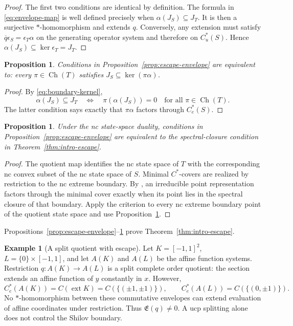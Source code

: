 \documentclass[11pt,a4paper]{amsart}
\theoremstyle{plain}
\newtheorem{proposition}[theorem]{Proposition}
\theoremstyle{definition}
\newtheorem{example}[theorem]{Example}
\newcommand{\Cu}{C_u^*}
\newcommand{\Ce}{C_e^*}
\newcommand{\Esc}{\mathfrak E}
\newcommand{\Ch}{\operatorname{Ch}}
\begin{document}
\begin{proof}
The first two conditions are identical by definition.  The formula in
\eqref{eq:envelope-map} is well defined precisely when $\alpha(J_S)\subseteq J_T$.  It is then a
surjective $*$-homomorphism and extends $q$.  Conversely, any extension must satisfy
$\overline q\epsilon_S=\epsilon_T\alpha$ on the generating operator system and therefore on
$\Cu(S)$.  Hence $\alpha(J_S)\subseteq\ker\epsilon_T=J_T$.
\end{proof}

\begin{proposition}\label{prop:escape-boundary-reps}
Conditions in Proposition~\ref{prop:escape-envelope} are equivalent to: every
$\pi\in\Ch(T)$ satisfies $J_S\subseteq\ker(\pi\alpha)$.
\end{proposition}

\begin{proof}
By \eqref{eq:boundary-kernel},
\[
 \alpha(J_S)\subseteq J_T
 \quad\Longleftrightarrow\quad
 \pi(\alpha(J_S))=0\quad\text{for all }\pi\in\Ch(T).
\]
The latter condition says exactly that $\pi\alpha$ factors through $\Ce(S)$.
\end{proof}

\begin{proposition}\label{prop:escape-spectral}
Under the nc state-space duality, conditions in Proposition~\ref{prop:escape-envelope} are
equivalent to the spectral-closure condition in Theorem~\ref{thm:intro-escape}.
\end{proposition}

\begin{proof}
The quotient map identifies the nc state space of $T$ with the corresponding nc convex subset of
the nc state space of $S$.  Minimal $C^*$-covers are realized by restriction to the nc extreme
boundary.  By \cite[Proposition~9.2]{KKM2023}, an irreducible point representation factors through
the minimal cover exactly when its point lies in the spectral closure of that boundary.  Apply the
criterion to every nc extreme boundary point of the quotient state space and use
Proposition~\ref{prop:escape-boundary-reps}.
\end{proof}

Propositions~\ref{prop:escape-envelope}--\ref{prop:escape-spectral} prove
Theorem~\ref{thm:intro-escape}.

\begin{example}[A split quotient with escape]\label{ex:square-segment}
Let $K=[-1,1]^2$, $L=\{0\}\times[-1,1]$, and let $A(K)$ and $A(L)$ be the affine function
systems.  Restriction $q:A(K)\to A(L)$ is a split complete order quotient: the section extends an
affine function of $y$ constantly in $x$.  However,
\[
 \Ce(A(K))=C(\operatorname{ext}K)=C(\{(\pm1,\pm1)\}),\qquad
 \Ce(A(L))=C(\{(0,\pm1)\}).
\]
No $*$-homomorphism between these commutative envelopes can extend evaluation of affine
coordinates under restriction.  Thus $\Esc(q)\ne0$.  A ucp splitting alone does not control the
Shilov boundary.
\end{example}
\end{document}
